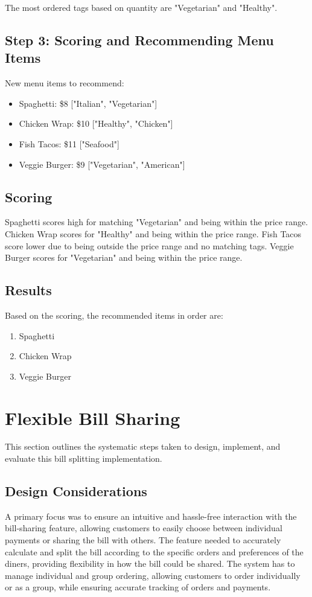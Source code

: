 The most ordered tags based on quantity are "Vegetarian" and "Healthy".

\subsection*{Step 3: Scoring and Recommending Menu Items}

New menu items to recommend:
\begin{itemize}
    \item Spaghetti: \$8 ["Italian", "Vegetarian"]
    \item Chicken Wrap: \$10 ["Healthy", "Chicken"]
    \item Fish Tacos: \$11 ["Seafood"]
    \item Veggie Burger: \$9 ["Vegetarian", "American"]
\end{itemize}

\subsection*{Scoring}

Spaghetti scores high for matching "Vegetarian" and being within the price range.
Chicken Wrap scores for "Healthy" and being within the price range.
Fish Tacos score lower due to being outside the price range and no matching tags.
Veggie Burger scores for "Vegetarian" and being within the price range.


\subsection*{Results}

Based on the scoring, the recommended items in order are:
\begin{enumerate}
    \item Spaghetti
    \item Chicken Wrap
    \item Veggie Burger
\end{enumerate}

\section{Flexible Bill Sharing}

This section outlines the systematic steps taken to design, implement, and evaluate this bill splitting implementation.

\subsection{Design Considerations}
A primary focus was to ensure an intuitive and hassle-free interaction with the bill-sharing feature, allowing customers to easily choose between individual payments or sharing the bill with others. The feature needed to accurately calculate and split the bill according to the specific orders and preferences of the diners, providing flexibility in how the bill could be shared. The system has to manage individual and group ordering, allowing customers to order individually or as a group, while ensuring accurate tracking of orders and payments.

